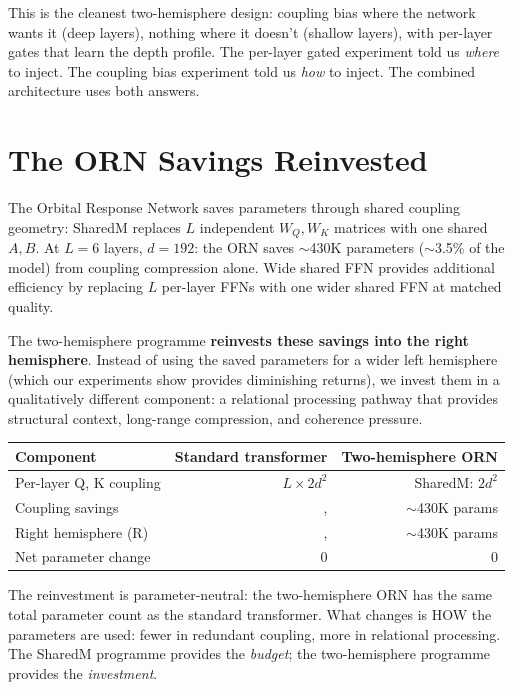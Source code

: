 \documentclass[11pt, a4paper]{article}
\theoremstyle{plain}
\theoremstyle{definition}
\theoremstyle{remark}
\begin{document}
This is the cleanest two-hemisphere design: coupling bias where the network wants it (deep layers), nothing where it doesn't (shallow layers), with per-layer gates that learn the depth profile.
The per-layer gated experiment told us \emph{where} to inject.
The coupling bias experiment told us \emph{how} to inject.
The combined architecture uses both answers.


\section{The ORN Savings Reinvested}
\label{sec:reinvestment}

The Orbital Response Network saves parameters through shared coupling geometry:
SharedM replaces $L$ independent $W_Q, W_K$ matrices with one shared $A, B$.
At $L = 6$ layers, $d = 192$: the ORN saves $\sim$430K parameters ($\sim$3.5\% of the model) from coupling compression alone.
Wide shared FFN provides additional efficiency by replacing $L$ per-layer FFNs with one wider shared FFN at matched quality.

The two-hemisphere programme \textbf{reinvests these savings into the right hemisphere}.
Instead of using the saved parameters for a wider left hemisphere (which our experiments show provides diminishing returns), we invest them in a qualitatively different component: a relational processing pathway that provides structural context, long-range compression, and coherence pressure.

\begin{center}\small
\begin{tabular}{lrr}
\toprule
\textbf{Component} & \textbf{Standard transformer} & \textbf{Two-hemisphere ORN} \\
\midrule
Per-layer Q, K coupling & $L \times 2d^2$ & SharedM: $2d^2$ \\
Coupling savings & ,  & $\sim$430K params \\
Right hemisphere (R) & ,  & $\sim$430K params \\
\midrule
Net parameter change & 0 & 0 \\
\bottomrule
\end{tabular}
\end{center}

The reinvestment is parameter-neutral: the two-hemisphere ORN has the same total parameter count as the standard transformer.
What changes is HOW the parameters are used: fewer in redundant coupling, more in relational processing.
The SharedM programme provides the \emph{budget}; the two-hemisphere programme provides the \emph{investment}.
\end{document}
